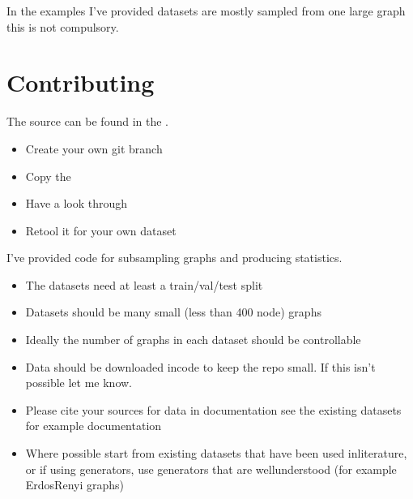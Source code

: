 \documentclass[letterpaper,10pt,english]{sphinxhowto}
\begin{document}
\sphinxAtStartPar
In the examples I’ve provided datasets are mostly sampled from one large graph \sphinxhyphen{} this is not compulsory.


\section{Contributing}
\label{\detokenize{index:contributing}}
\sphinxAtStartPar
The source can be found in the .
\begin{description}
\begin{itemize}
\item {} 
\sphinxAtStartPar
Create your own git branch

\item {} 
\sphinxAtStartPar
Copy the 

\item {} 
\sphinxAtStartPar
Have a look through

\item {} 
\sphinxAtStartPar
Re\sphinxhyphen{}tool it for your own dataset

\end{itemize}

\end{description}

\sphinxAtStartPar
I’ve provided code for sub\sphinxhyphen{}sampling graphs and producing statistics.
\begin{description}
\begin{itemize}
\item {} 
\sphinxAtStartPar
The datasets need at least a train/val/test split

\item {} 
\sphinxAtStartPar
Datasets should be many small (less than 400 node) graphs

\item {} 
\sphinxAtStartPar
Ideally the number of graphs in each dataset should be controllable

\item {} 
\sphinxAtStartPar
Data should be downloaded in\sphinxhyphen{}code to keep the repo small. If this isn’t possible let me know.

\item {} 
\sphinxAtStartPar
Please cite your sources for data in documentation \sphinxhyphen{} see the existing datasets for example documentation

\item {} 
\sphinxAtStartPar
Where possible start from existing datasets that have been used in\sphinxhyphen{}literature, or if using generators, use generators that are well\sphinxhyphen{}understood (for example Erdos\sphinxhyphen{}Renyi graphs)

\end{itemize}

\end{description}
\end{document}
